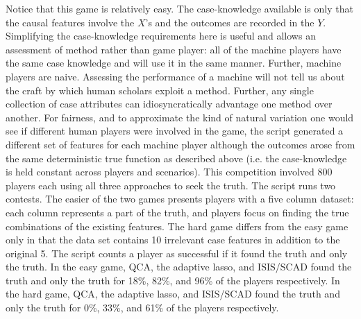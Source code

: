 \documentclass[12pt]{article}
\begin{document}
Notice that this game is relatively easy. The case-knowledge available is only
that the causal features involve the $X$'s and the outcomes are recorded in
the $Y$. Simplifying the case-knowledge requirements here is useful and allows
an assessment of method rather than game player: all of the machine players
have the same case knowledge and will use it in the same manner. Further,
machine players are naive. Assessing the performance of a machine will not
tell us about the craft by which human scholars exploit a method.  Further,
any single collection of case attributes can idiosyncratically advantage one
method over another. For fairness, and to approximate the kind of natural
variation one would see if different human players were involved in the game,
the script generated a different set of features for each machine player
although the outcomes arose from the same deterministic true function as
described above (i.e. the case-knowledge is held constant across players and
scenarios).  This competition involved 800 players each using all three
approaches to seek the truth.  The script runs two contests. The easier of the
two games presents players with a five column dataset: each column represents
a part of the truth, and players focus on finding the true combinations of the
existing features.  The hard game differs from the easy game only in that the
data set contains 10 irrelevant case features in addition to the original 5.
The script counts a player as successful if it found the truth and only the
truth.  In the easy game, QCA, the adaptive lasso, and ISIS/SCAD found the
truth and only the truth for 18\%, 82\%, and 96\% of the players respectively.
In the hard game, QCA, the adaptive lasso, and ISIS/SCAD found the truth and
only the truth for 0\%, 33\%, and 61\% of the players respectively. 
\end{document}
